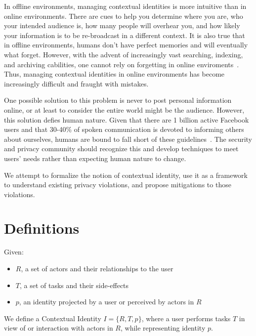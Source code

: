 \documentclass{llncs}
\begin{document}
In offline environments, managing contextual identities is more intuitive than
in online environments. There are cues to help you determine where you are,
who your intended audience is, how many people will overhear you, and how
likely your information is to be re-broadcast in a different context. It is
also true that in offline environments, humans don't have perfect memories and
will eventually what forget.  However, with the advent of increasingly vast
searching, indexing, and archiving cabilities, one cannot rely on forgetting in
online enviroments~\cite{delete}. Thus, managing contextual identities in
online environments has become increasingly difficult and fraught with
mistakes.

One possible solution to this problem is never to post personal information
online, or at least to consider the entire world might be the audience.
However, this solution defies human nature. Given that there are 1 billion
active Facebook users and that 30-40\% of spoken communication is devoted to
informing others about ourselves, humans are bound to fall short of these
guidelines~\cite{tamir,fbusers}. The security and privacy community should
recognize this and develop techniques to meet users' needs rather than
expecting human nature to change.

We attempt to formalize the notion of contextual identity, use it as a
framework to understand existing privacy violations, and propose mitigations to
those violations.

\section{Definitions}

\begin{definition}
  Given:
  \begin{itemize}
    \item $R$, a set of actors and their relationships to the user
    \item $T$, a set of tasks and their side-effects
    \item $p$, an identity projected by a user or perceived by actors in $R$
  \end{itemize}
\medskip

  We define a Contextual Identity $I = \{R,T,p\}$, where a user performs tasks
$T$ in view of or interaction with actors in $R$, while representing identity
$p$.  

\end{definition}
\end{document}
